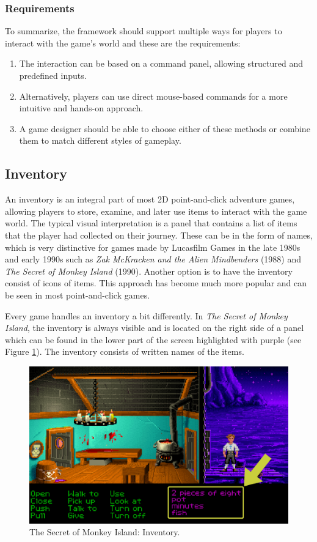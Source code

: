 \subsubsection{Requirements}
To summarize, the framework should support multiple ways for players to interact with the game's world and these are the requirements:

\begin{enumerate}[label=\color{teal}\textbf{R{\arabic*}}]
  \item \label{intro:req:com_pan} The interaction can be based on a command panel, allowing structured and predefined inputs.
  \item \label{intro:req:mouse} Alternatively, players can use direct mouse-based commands for a more intuitive and hands-on approach.
  \item \label{intro:req:mix} A game designer should be able to choose either of these methods or combine them to match different styles of gameplay.
\end{enumerate}

\subsection{Inventory}
\label{sec:Inventory}
An inventory is an integral part of most 2D point-and-click adventure games, allowing players to store, examine, and later use items to interact with the game world. The typical visual interpretation is a panel that contains a list of items that the player had collected on their journey. These can be in the form of names, which is very distinctive for games made by Lucasfilm Games in the late 1980s and early 1990s such as \textit{Zak McKracken and the Alien Mindbenders} (1988) and \textit{The Secret of Monkey Island} (1990). Another option is to have the inventory consist of icons of items. This approach has become much more popular and can be seen in most point-and-click games.

Every game handles an inventory a bit differently. In \textit{The Secret of Monkey Island}, the inventory is always visible and is located on the right side of a panel which can be found in the lower part of the screen highlighted with purple (see Figure \ref{fig:I-TSoMI}). The inventory consists of written names of the items. 

\begin{figure}[H]
\centering
\includegraphics[width=.8\linewidth]{img/I-TSoMI.png}
\caption{The Secret of Monkey Island: Inventory.}
\label{fig:I-TSoMI}
\end{figure}


